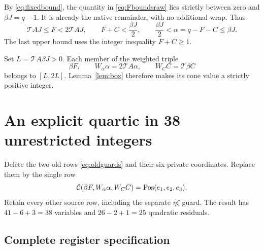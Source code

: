 \documentclass[11pt]{article}
\theoremstyle{remark}\newtheorem{remark}[theorem]{Remark}
\begin{document}
By \eqref{eq:fixedbound}, the quantity in \eqref{eq:Fboundsraw} lies strictly between zero and $\beta J=q-1$. It is already the native remainder, with no additional wrap. Thus
\[
 \mathcal T AJ\le F<2\mathcal T AJ,\qquad
 F+C<\frac{\beta J}{2},\qquad
 \frac{\beta J}{2}<\alpha=q-F-C\le\beta J.
\]
The last upper bound uses the integer inequality $F+C\ge1$.

Set $L=\mathcal T A\beta J>0$. Each member of the weighted triple
\begin{equation}\label{eq:weightedtriple}
 \beta F,\qquad W_\alpha\alpha=2\mathcal T A\alpha,\qquad
 W_C C=\mathcal T\beta C
\end{equation}
belongs to $[L,2L]$. Lemma~\ref{lem:box} therefore makes its cone value a strictly positive integer.

\section{An explicit quartic in 38 unrestricted integers}\label{sec:quartic}

Delete the two old rows \eqref{eq:oldguards} and their six private coordinates. Replace them by the single row
\begin{equation}\label{eq:newguard}
 \mathcal C(\beta F,W_\alpha\alpha,W_C C)=\operatorname{Pos}(e_1,e_2,e_3).
\end{equation}
Retain every other source row, including the separate $\eta\zeta$ guard. The result has $41-6+3=38$ variables and $26-2+1=25$ quadratic residuals.

\subsection{Complete register specification}
\end{document}
